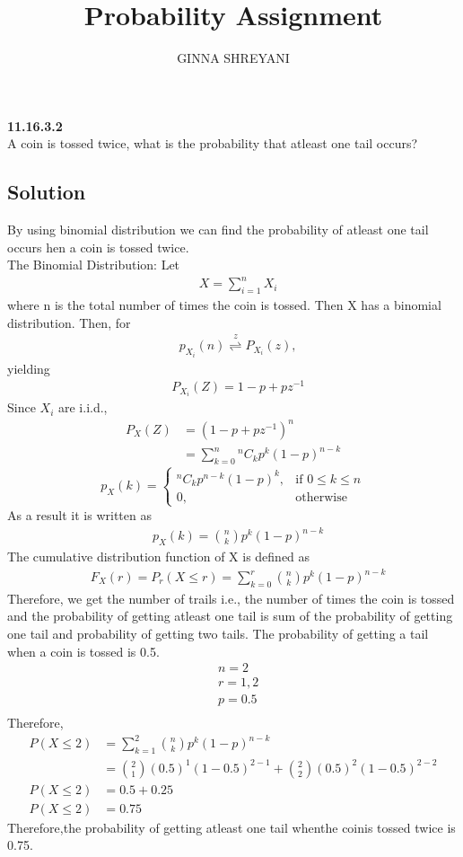 \documentclass[10pt,twocolumn]{article}
\title{
Probability Assignment
}
\author{GINNA SHREYANI}
\date{}
\newcommand*{\Comb}[2]{{}^{#1}C_{#2}}%
\begin{document}
\maketitle


\textbf{11.16.3.2}\\
A coin is tossed twice, what is the probability that atleast one tail occurs?\\
\subsection*{Solution}
By using binomial distribution we can find the probability of atleast one tail occurs hen a coin is tossed twice.\\
The Binomial Distribution: Let
\begin{align}
	&X = \sum_{i=1}^n X_i
     \label{eq-1}
\end{align}
where n is the total number of times the coin is tossed. Then X has a binomial distribution. Then, for
\begin{align}
	&p_{X_i}(n){\stackrel{z}{\rightleftharpoons}}P_{X_i}(z),
     \label{eq-2}
\end{align}
yielding
\begin{align}
	&P_{X_i}(Z)= 1-p+pz^{-1}
	\label{eq-3}
\end{align}
Since $X_i$ are i.i.d.,
\begin{align}
	P_X(Z)&=(1-p+pz^{-1})^n\\
	&=\sum_{k=0}^n{\Comb{n}{k}p^{k}(1-p)^{n-k}}
\end{align}
\[
	p_X(k)=
	\begin{cases}
		\Comb{n}{k}p^{n-k}(1-p)^k,& \text{if } 0\leq k\leq n\\
		0,& \text{otherwise}
	\end{cases}
\]
As a result it is written as
\begin{align}
	\label{eq-6}
	&p_X(k)=\binom nk p^{k}(1-p)^{n-k}
\end{align}
The cumulative distribution function of X is defined as
\begin{align}
	&F_X(r)=P_r(X\leq r) = \sum_{k=0}^r\binom nk p^{k}(1-p)^{n-k}
	\label{eq-7}
\end{align}
Therefore, we get the number of trails i.e., the number of times the coin is tossed and the probability of getting atleast one tail is sum of the probability of getting one tail and probability of getting two tails.
The probability of getting a tail when a coin is tossed is 0.5.
\begin{align*}
	&n = 2\\
	&r = 1,2\\
	&p = 0.5\\
\end{align*}
Therefore,
\begin{align}
	P(X\leq 2)&=\sum_{k=1}^2 \binom nk p^k(1-p)^{n-k}\\
	&=\binom 21(0.5)^1(1-0.5)^{2-1}+\binom 22 (0.5)^2(1-0.5)^{2-2}\\
	P(X\leq 2)&=0.5+0.25\\
	P(X\leq 2)&= 0.75
\end{align}
Therefore,the probability of getting atleast one tail whenthe coinis tossed twice is 0.75. 
\end{document}
